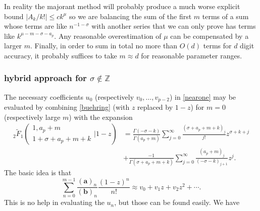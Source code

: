 \documentclass[12pt]{article}
\numberwithin{equation}{section}
\begin{document}
In reality the majorant method will probably produce a much worse explicit bound $|A_k/k!| \le c k^{\mu}$ so we are balancing the sum of the first $m$ terms of a sum whose terms are like $n^{-1-\sigma}$ with another series that we can only prove has terms like $k^{\mu-m-\sigma-a_p}$. Any reasonable overestimation of $\mu$ can be compensated by a larger $m$. Finally, in order to sum in total no more than $O(d)$ terms for $d$ digit accuracy, it probably suffices to take $m \approx d$ for reasonable parameter ranges.

\subsubsection{hybrid approach for $\sigma \not \in \mathbb{Z}$}
The necessary coefficients $u_0$ (respectively $v_0,\dots,v_{p-2}$) in \eqref{nearone} may be evaluated by combining \eqref{buehring} (with $z$ replaced by $1-z$) for $m=0$ (respectively large $m$) with the expansion
\begin{equation}
\label{2f1nearone}
\begin{aligned}
{}_2\tilde{F}_1\left(\begin{array}{c} 1,a_p+m \\ 1+\sigma+a_p+m+k \end{array} \Big| 1-z\right) &= \frac{\Gamma (-\sigma-k)}{\Gamma (a_p+m)} \sum_{j=0}^{\infty} \frac{(\sigma+a_p+m+k)_j}{j!}z^{\sigma+k+j}\\
&+\frac{-1}{\Gamma
   \left(\sigma+a_p+m+k\right)} \sum_{j=0}^{\infty} \frac{(a_p+m)_j}{(-\sigma-k)_{j+1}} z^j\text{.}
\end{aligned}
\end{equation}
The basic idea is that
\begin{equation}
\label{viapprox}
\sum_{n=0}^{m-1} \frac{(\mathbf a)_n}{(\mathbf b)_n}\frac{(1-z)^n}{n!} \approx v_0 + v_1 z + v_2 z^2 + \cdots\text{.}
\end{equation}
This is no help in evaluating the $u_n$, but those can be found easily. We have
\end{document}
